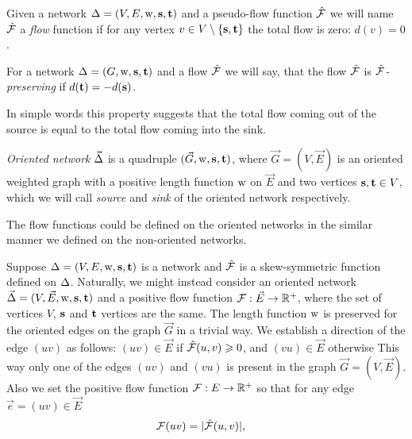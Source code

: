 \documentclass[12pt]{article}
\begin{document}
    \begin{definition}
      Given a network $\Delta = (V, E, \mathrm{w}, \mathbf{s}, \mathbf{t})$ and a pseudo-flow function $\mathcal{\hat{F}}$ we will name $\mathcal{\hat{F}}$ a
        \emph{flow} function if for any vertex $v \in V \setminus \{\mathbf{s}, \mathbf{t}\}$ the total flow is zero: $d(v) = 0$.
    \end{definition}
    \begin{definition}
      For a network $\Delta = (G, \mathrm{w}, \mathbf{s}, \mathbf{t})$ and a flow $\mathcal{\hat{F}}$ we will say,
      that the flow $\mathcal{\hat{F}}$ is \emph{$\mathcal{\hat{F}}$-preserving} if $d(\mathbf{t}) = -d(\mathbf{s})$.
    \end{definition}
    \begin{note}
      In simple words this property suggests
        that the total flow coming out of the source is equal to the total flow
        coming into the sink.
    \end{note}
    \begin{definition}
      \emph{Oriented network} $\vec{\Delta}$ is a quadruple $(\vec{G}, \mathrm{w}, \mathbf{s}, \mathbf{t})$, where
        $\vec{G} = (V, \vec{E})$ is an oriented weighted graph with
        a positive length function $\mathrm{w}$ on $\vec{E}$ and two vertices $\mathbf{s}, \mathbf{t} \in V$, which
        we will call \emph{source} and \emph{sink} of the oriented network respectively.
    \end{definition}
    \begin{note}
      The flow functions could be defined on the oriented networks in the similar manner
      we defined on the non-oriented networks.
    \end{note}
    Suppose $\Delta = (V, E, \mathrm{w}, \mathbf{s}, \mathbf{t})$ is a network and $\mathcal{\hat{F}}$ is a skew-symmetric function defined
    on $\Delta$.
    Naturally, we might instead consider an oriented network $\vec{\Delta} = (V, \vec{E}, \mathrm{w}, \mathbf{s}, \mathbf{t})$ and a
      positive flow function $\mathcal{F}: \vec{E} \to \mathbb{R}^{+}$, where
      the set of vertices $V$, $\mathbf{s}$ and $\mathbf{t}$ vertices are the same.
    The length function $\mathrm{w}$ is preserved for the oriented edges on the graph $\vec{G}$ in a trivial way.
    We establish a direction of the edge $(uv)$ as follows:
      $(uv) \in \vec{E}$ if $\mathcal{\hat{F}}(u, v) \geqslant 0$, and $(vu) \in \vec{E}$ otherwise
    This way only one of the edges $(uv)$ and $(vu)$ is present in the graph $\vec{G} = (V, \vec{E})$.
    Also we set the positive flow function $\mathcal{F}: E \to \mathbb{R}^{+}$ so that
      for any edge $\vec{e} = (uv) \in \vec{E}$
    \begin{align*}
      &\mathcal{F}(u v) = |\mathcal{\hat{F}}(u,v)|,
    \end{align*}
\end{document}
